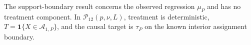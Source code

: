 The support-boundary result concerns the observed regression \(\mu_P\) and has no treatment component.  In \(\mathcal P_{12}(p,\nu,L)\), treatment is deterministic, \(T=\mathbf1\{X\in\mathcal A_{1,P}\}\), and the causal target is \(\tau_P\) on the known interior assignment boundary.